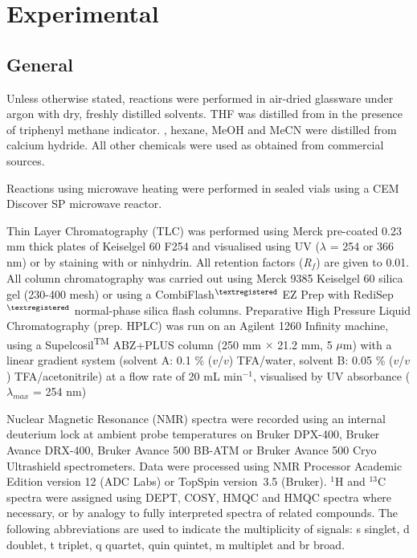 \newpage

\section{Experimental}

\subsection{General}

Unless otherwise stated, reactions were performed in air-dried glassware under argon with dry, freshly distilled solvents. THF was distilled from  in the presence of triphenyl methane indicator. , hexane, MeOH and MeCN were distilled from calcium hydride. All other chemicals were used as obtained from commercial sources.

Reactions using microwave heating were performed in sealed vials using a CEM Discover SP microwave reactor. 

Thin Layer Chromatography (TLC) was performed using Merck pre-coated 0.23 mm thick plates of Keiselgel 60 F254 and visualised using UV ($\lambda$ = 254 or 366 nm) or by staining with  or ninhydrin. 
All retention factors (\textit{R}$_\textit{f}$) are given to 0.01. 
All column chromatography was carried out using Merck 9385 Keiselgel 60 silica gel (230-400 mesh) or using a CombiFlash$^{\tiny{\textregistered}}$ EZ Prep with RediSep$^{\tiny{\textregistered}}$ normal-phase silica flash columns. 
Preparative High Pressure Liquid Chromatography (prep. HPLC) was run on an Agilent 1260 Infinity machine, using a Supelcosil\textsuperscript{TM} ABZ+PLUS column (250 mm $\times$ 21.2 mm, 5 $\mu$m) with a linear gradient system (solvent A: 0.1 \% ($v$/$v$) TFA/water, solvent B: 0.05 \% ($v$/$v$) TFA/acetonitrile) at a flow rate of 20 mL min$^{-1}$, visualised by UV absorbance ($\lambda_{max}$ = 254 nm)

Nuclear Magnetic Resonance (NMR) spectra were recorded using an internal deuterium lock at ambient probe temperatures on Bruker DPX-400, Bruker Avance DRX-400, Bruker Avance 500 BB-ATM or Bruker Avance 500 Cryo Ultrashield spectrometers. Data were processed using NMR Processor Academic Edition version 12 (ADC Labs) or TopSpin version 3.5 (Bruker). $^1$H and $^13$C spectra were assigned using DEPT, COSY, HMQC and HMQC spectra where necessary, or by analogy to fully interpreted spectra of related compounds. The following abbreviations are used to indicate the multiplicity of signals: s singlet, d doublet, t triplet, q quartet, quin quintet, m multiplet and br broad.

